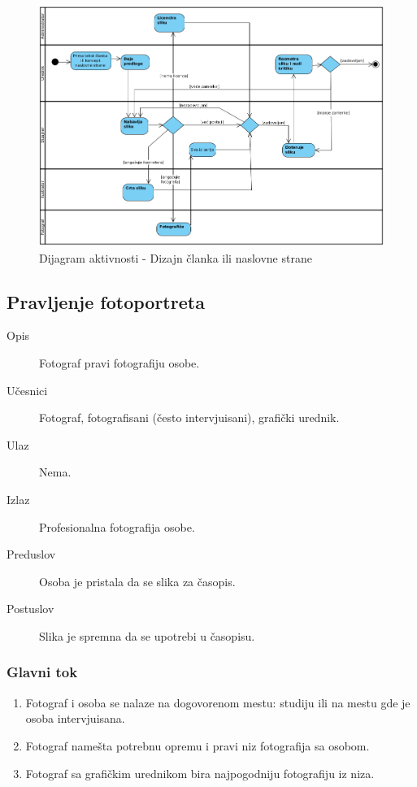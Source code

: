 \begin{figure}[htbp]
    \centering
    \includegraphics[height=0.4\textheight]{slike/grafika}
    \caption{Dijagram aktivnosti - Dizajn članka ili naslovne strane}
    \label{grafika}
\end{figure}

\subsection{Pravljenje fotoportreta}
\begin{description}
\item [Opis] Fotograf pravi fotografiju osobe.
\item [Učesnici] Fotograf, fotografisani (često intervjuisani), grafički urednik.
\item [Ulaz] Nema.
\item [Izlaz] Profesionalna fotografija osobe.
\item [Preduslov] Osoba je pristala da se slika za časopis.
\item [Postuslov] Slika je spremna da se upotrebi u časopisu.
\end{description}
\subsubsection{Glavni tok}
\begin{enumerate} 
\item Fotograf i osoba se nalaze na dogovorenom mestu: studiju ili na mestu gde je osoba intervjuisana.
\item Fotograf namešta potrebnu opremu i pravi niz fotografija sa osobom.
\item Fotograf sa grafičkim urednikom bira najpogodniju fotografiju iz niza.
\end{enumerate}
